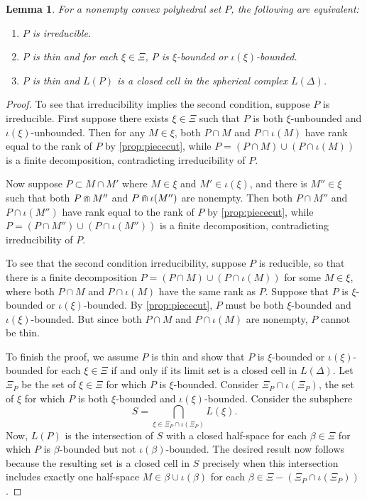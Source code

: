 \documentclass[10pt,a4paper]{amsart}
\newtheorem{lemma}{Lemma}
\begin{document}
\begin{lemma} \label{lem:irred-form} For a nonempty convex polyhedral
  set $P$, the following are equivalent:
  \begin{enumerate}
  \item \label{cond-irred} $P$ is irreducible.
  \item \label{cond-bound} $P$ is thin and for each $\xi \in \Xi$, $P$
    is $\xi$-bounded or $\iota(\xi)$-bounded.
  \item $P$ is thin and $L(P)$ is a closed cell in the spherical
    complex $L(\Delta)$.
  \end{enumerate}
\end{lemma}

\begin{proof}
  To see that irreducibility implies the second condition, suppose $P$
  is irreducible. First suppose there exists $\xi \in \Xi$ such that
  $P$ is both $\xi$-unbounded and $\iota(\xi)$-unbounded. Then for any
  $M\in \xi$, both $P \cap M$ and $P\cap \iota(M)$ have rank equal to
  the rank of $P$ by \cref{prop:piececut}, while
  $P = (P\cap M) \cup (P\cap \iota(M))$ is a finite decomposition,
  contradicting irreducibility of $P$.
  
  Now suppose $P\subset M\cap M'$ where $M\in \xi$ and
  $M'\in \iota(\xi)$, and there is $M''\in\xi$ such that both
  $P\doublecap M''$ and $P\doublecap \iota(M'')$ are nonempty. Then
  both $P \cap M''$ and $P\cap \iota(M'')$ have rank equal to the rank
  of $P$ by \cref{prop:piececut}, while
  $P = (P\cap M'') \cup (P\cap \iota(M''))$ is a finite decomposition,
  contradicting irreducibility of $P$.
  
  To see that the second condition irreducibility, suppose $P$ is
  reducible, so that there is a finite decomposition
  $P = (P\cap M) \cup (P\cap \iota(M))$ for some $M\in \xi$, where
  both $P\cap M$ and $P\cap \iota(M)$ have the same rank as
  $P$. Suppose that $P$ is $\xi$-bounded or
  $\iota(\xi)$-bounded. By \cref{prop:piececut}, $P$ must be both
  $\xi$-bounded and $\iota(\xi)$-bounded. But since both
  $P\cap M$ and $P\cap \iota(M)$ are nonempty, $P$ cannot be thin.

  To finish the proof, we assume $P$ is thin and show that $P$ is
  $\xi$-bounded or $\iota(\xi)$-bounded for each $\xi\in \Xi$ if and
  only if its limit set is a closed cell in $L(\Delta)$.  Let $\Xi_P$
  be the set of $\xi\in \Xi$ for which $P$ is $\xi$-bounded. Consider
  $\Xi_P \cap \iota(\Xi_P)$, the set of $\xi$ for which $P$ is both
  $\xi$-bounded and $\iota(\xi)$-bounded. Consider the subsphere
  \[
    S = \bigcap_{\xi \in \Xi_P\cap \iota(\Xi_P)} L(\xi).
  \]
  Now, $L(P)$ is the intersection of $S$ with a closed half-space for
  each $\beta \in \Xi$ for which $P$ is $\beta$-bounded but not
  $\iota(\beta)$-bounded. The desired result now follows because the
  resulting set is a closed cell in $S$ precisely when this
  intersection includes exactly one half-space
  $M\in \beta\cup \iota(\beta)$ for each
  $\beta \in \Xi - (\Xi_P \cap \iota(\Xi_P))$.
\end{proof}
\end{document}
